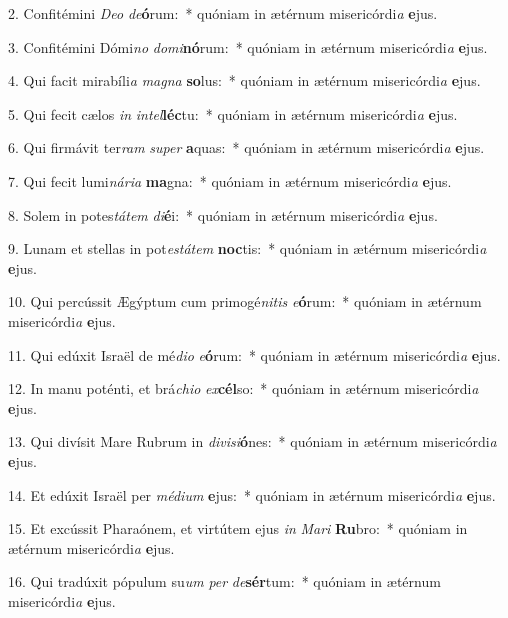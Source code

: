 2. Confitémini \textit{De}\textit{o} \textit{de}\textbf{ó}rum:~*  quóniam in ætérnum misericórdi\textit{a} \textbf{e}jus.\

3. Confitémini Dómi\textit{no} \textit{do}\textit{mi}\textbf{nó}rum:~*  quóniam in ætérnum misericórdi\textit{a} \textbf{e}jus.\

4. Qui facit mirabíli\textit{a} \textit{ma}\textit{gna} \textbf{so}lus:~*  quóniam in ætérnum misericórdi\textit{a} \textbf{e}jus.\

5. Qui fecit cælos \textit{in} \textit{in}\textit{tel}\textbf{léc}tu:~*  quóniam in ætérnum misericórdi\textit{a} \textbf{e}jus.\

6. Qui firmávit ter\textit{ram} \textit{su}\textit{per} \textbf{a}quas:~*  quóniam in ætérnum misericórdi\textit{a} \textbf{e}jus.\

7. Qui fecit lumi\textit{ná}\textit{ri}\textit{a} \textbf{ma}gna:~*  quóniam in ætérnum misericórdi\textit{a} \textbf{e}jus.\

8. Solem in potes\textit{tá}\textit{tem} \textit{di}\textbf{é}i:~*  quóniam in ætérnum misericórdi\textit{a} \textbf{e}jus.\

9. Lunam et stellas in pot\textit{es}\textit{tá}\textit{tem} \textbf{noc}tis:~*  quóniam in ætérnum misericórdi\textit{a} \textbf{e}jus.\

10. Qui percússit Ægýptum cum primogé\textit{ni}\textit{tis} \textit{e}\textbf{ó}rum:~*  quóniam in ætérnum misericórdi\textit{a} \textbf{e}jus.\

11. Qui edúxit Israël de mé\textit{di}\textit{o} \textit{e}\textbf{ó}rum:~*  quóniam in ætérnum misericórdi\textit{a} \textbf{e}jus.\

12. In manu poténti, et brá\textit{chi}\textit{o} \textit{ex}\textbf{cél}so:~*  quóniam in ætérnum misericórdi\textit{a} \textbf{e}jus.\

13. Qui divísit Mare Rubrum in \textit{di}\textit{vi}\textit{si}\textbf{ó}nes:~*  quóniam in ætérnum misericórdi\textit{a} \textbf{e}jus.\

14. Et edúxit Israël per \textit{mé}\textit{di}\textit{um} \textbf{e}jus:~*  quóniam in ætérnum misericórdi\textit{a} \textbf{e}jus.\

15. Et excússit Pharaónem, et virtútem ejus \textit{in} \textit{Ma}\textit{ri} \textbf{Ru}bro:~*  quóniam in ætérnum misericórdi\textit{a} \textbf{e}jus.\

16. Qui tradúxit pópulum su\textit{um} \textit{per} \textit{de}\textbf{sér}tum:~*  quóniam in ætérnum misericórdi\textit{a} \textbf{e}jus.\

